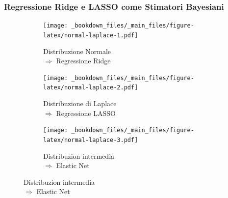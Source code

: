 \documentclass[pdf, aspectratio=169]{beamer}\usepackage[]{graphicx}\usepackage[]{color}
\theoremstyle{definition}
\begin{document}
\begin{frame}
\frametitle{Regressione Ridge e LASSO come Stimatori Bayesiani}

\fontsize{9pt}{11pt}\selectfont

\begin{figure}
  \centering
  \begin{subfigure}[b]{5cm}
    \captionsetup{justification=raggedright}
    \centering
    \caption{\hspace{0.9cm} Distribuzione Normale \\ \hspace{0.9cm} $\Rightarrow$ Regressione Ridge}
    \texttt{[image: \_bookdown\_files/\_main\_files/figure-latex/normal-laplace-1.pdf]}
  \end{subfigure}
  \qquad
  \begin{subfigure}[b]{5cm}
    \captionsetup{justification=raggedright}
    \centering
    \caption{\hspace{0.9cm} Distribuzione di Laplace \\ \hspace{0.9cm} $\Rightarrow$ Regressione LASSO}
    \texttt{[image: \_bookdown\_files/\_main\_files/figure-latex/normal-laplace-2.pdf]}
  \end{subfigure}
  \begin{subfigure}[b]{5cm}
    \captionsetup{justification=raggedright}
    \centering
    \caption{\hspace{0.9cm} Distribuzion intermedia \\ \hspace{0.9cm} $\Rightarrow$ Elastic Net}
    \texttt{[image: \_bookdown\_files/\_main\_files/figure-latex/normal-laplace-3.pdf]}
  \end{subfigure}
\end{figure}

\end{frame}
\end{document}
